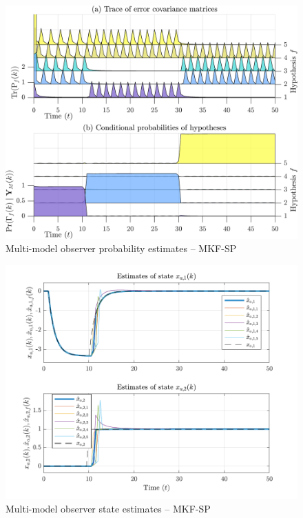 \begin{figure}[htp]
	\centering
	\includegraphics[width=12cm]{images/rod_MKF_test_sim_MKF_SP_prob.png}
	\caption{Multi-model observer probability estimates – MKF-SP}
	\label{fig:rod-obs-sim-test-probs-SP}
\end{figure}
\begin{figure}[htp]
	\centering
	\includegraphics[width=13cm]{images/rod_MKF_test_sim_MKF_SP_x_est.pdf}
	\caption{Multi-model observer state estimates – MKF-SP}
	\label{fig:rod-obs-sim-test-x_est-SP}
\end{figure}
